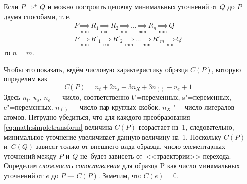 \documentclass[12pt]{article}
\begin{document}
Если \(P \Rightarrow^+ Q\) и можно построить цепочку минимальных уточнений от \(Q\) до \(P\) двумя способами, т.\,е.
\begin{equation*}
\begin{array}{l}
P \underset{\scriptscriptstyle\min}{\Rightarrow} R_1 \underset{\scriptscriptstyle\min}{\Rightarrow} R_2 \underset{\scriptscriptstyle\min}{\Rightarrow} \ldots \underset{\scriptscriptstyle\min}{\Rightarrow} R_n \underset{\scriptscriptstyle\min}{\Rightarrow} Q \\
P \underset{\scriptscriptstyle\min}{\Rightarrow} R'_1 \underset{\scriptscriptstyle\min}{\Rightarrow} R'_2 \underset{\scriptscriptstyle\min}{\Rightarrow} \ldots \underset{\scriptscriptstyle\min}{\Rightarrow} R'_m \underset{\scriptscriptstyle\min}{\Rightarrow} Q
\end{array}
\end{equation*}
то \(n = m\).

Чтобы это показать, ведём числовую характеристику образца \(C(P)\), которую определим как
\begin{equation*}
C(P) = n_t + 2n_s + 3n_X + 3n_{()} - n_e + 1
\end{equation*}
Здесь \(n_t\), \(n_s\), \(n_e\) --- число, соответственно t"=переменных, s"=переменных, e"=переменных, \(n_{()}\) --- число пар круглых  скобок, \(n_X\) "--- число литералов атомов. Нетрудно убедиться, что для каждого преобразования \eqref{eq:math:simpletransform} величина \(C(P)\) возрастает на~1, следовательно, минимальное уточнение увеличивает данную величину на~1. Поскольку \(C(P)\) и~\(C(Q)\) зависят только от внешнего вида образца, число элементарных уточнений между \(P\) и~\(Q\) не~будет зависеть от~<<траектории>> перехода. Определим \textit{сложность сопоставления} для образца P как число минимальных уточнений от $e$ до $P$ --- $C(P)$. Заметим, что $C(e) = 0$.
\end{document}
